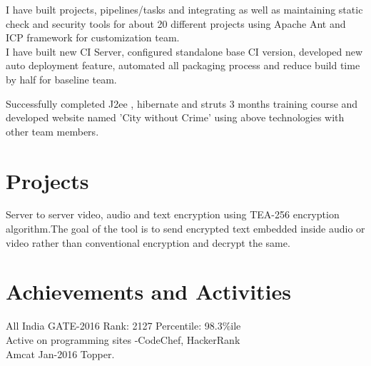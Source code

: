 \documentclass[]{deedy-resume-openfont}
\begin{document}
\begin{minipage}[t]{0.66\textwidth}
 I have built projects, pipelines/tasks and integrating as well as maintaining static check and security tools for about 20 different projects using Apache Ant and ICP framework  for customization team.  \\ I have built new CI Server, configured standalone base CI version, developed new auto deployment feature, automated all packaging process and reduce build time by half for baseline team.
\sectionsep


 Successfully completed J2ee , hibernate and struts 3 months training course and developed website named 'City without Crime' using above technologies with other team members.\\

\section{Projects}
Server to server video, audio and text encryption using TEA-256 encryption algorithm.The goal of the tool is to send encrypted text embedded inside audio or video rather than conventional encryption and decrypt the same.
\sectionsep


\section{Achievements and Activities} 
All  India GATE-2016 Rank: 2127 Percentile: 98.3\%ile\\
Active on programming sites -CodeChef, HackerRank\\
Amcat Jan-2016 Topper. \\
\sectionsep


 

\end{minipage} 
\end{document}
